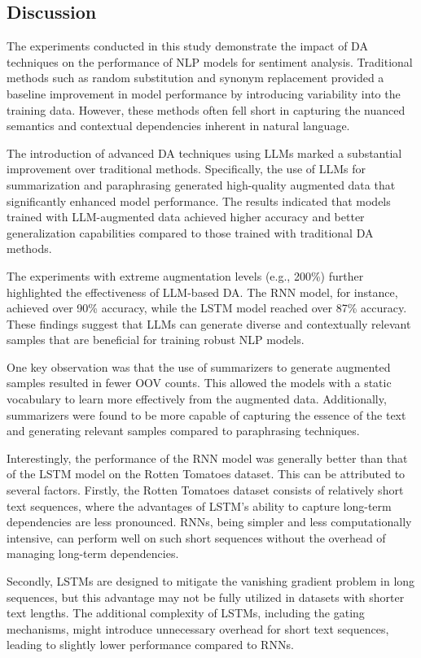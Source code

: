 \documentclass{article}
\begin{document}
\subsection{Discussion}

The experiments conducted in this study demonstrate the impact of DA techniques
on the performance of NLP models for sentiment analysis. Traditional methods
such as random substitution and synonym replacement provided a baseline
improvement in model performance by introducing variability into the training
data. However, these methods often fell short in capturing the nuanced
semantics and contextual dependencies inherent in natural language.

The introduction of advanced DA techniques using LLMs marked a substantial
improvement over traditional methods. Specifically, the use of LLMs for
summarization and paraphrasing generated high-quality augmented data that
significantly enhanced model performance. The results indicated that models
trained with LLM-augmented data achieved higher accuracy and better
generalization capabilities compared to those trained with traditional DA
methods.

The experiments with extreme augmentation levels (e.g., 200\%) further
highlighted the effectiveness of LLM-based DA. The RNN model, for instance,
achieved over 90\% accuracy, while the LSTM model reached over 87\% accuracy.
These findings suggest that LLMs can generate diverse and contextually relevant
samples that are beneficial for training robust NLP models.

One key observation was that the use of summarizers to generate augmented
samples resulted in fewer OOV counts. This allowed the models with a static
vocabulary to learn more effectively from the augmented data. Additionally,
summarizers were found to be more capable of capturing the essence of the text
and generating relevant samples compared to paraphrasing techniques.

Interestingly, the performance of the RNN model was generally better than that
of the LSTM model on the Rotten Tomatoes dataset. This can be attributed to
several factors. Firstly, the Rotten Tomatoes dataset consists of relatively
short text sequences, where the advantages of LSTM's ability to capture
long-term dependencies are less pronounced. RNNs, being simpler and less
computationally intensive, can perform well on such short sequences without the
overhead of managing long-term dependencies.

Secondly, LSTMs are designed to mitigate the vanishing gradient problem in long
sequences, but this advantage may not be fully utilized in datasets with
shorter text lengths. The additional complexity of LSTMs, including the gating
mechanisms, might introduce unnecessary overhead for short text sequences,
leading to slightly lower performance compared to RNNs.
\end{document}
